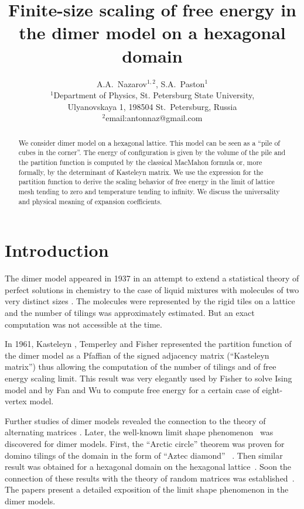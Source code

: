 \documentclass{article}
\begin{document}
\title{Finite-size scaling of free energy in the dimer model on a hexagonal domain}

\author{A.A.~Nazarov$^{1,2}$, S.A.~Paston$^{1}$\\
{\small
  $^{1}$Department of Physics, St. Petersburg State University,} \\
{\small  Ulyanovskaya 1, 198504 St.~Petersburg, Russia}\\
\small{$^{2}$email:antonnaz@gmail.com}
}
\date{}
\maketitle

\begin{abstract}
  We consider dimer model on a hexagonal lattice. This model can be seen as a ``pile of cubes in the
  corner''. The energy of configuration is given by the volume of the pile and the partition
  function is computed by the classical MacMahon formula or, more formally, by the determinant of
  Kasteleyn matrix. We use the expression for the partition function to derive the scaling behavior
  of free energy in the limit of lattice mesh tending to zero and temperature tending to infinity.
  We discuss the universality and physical meaning of expansion coefficients.
\end{abstract}


\section*{Introduction}
\label{sec:introduction}
The dimer model appeared in 1937 in an attempt to extend a statistical theory of perfect solutions
in chemistry to the case of liquid mixtures with molecules of two very distinct sizes
\cite{Fowler-1937}. The molecules were represented by the rigid tiles on a lattice and the number of
tilings was approximately estimated. But an exact computation was not accessible at the time.

In 1961, Kasteleyn \cite{P.W-1961}, Temperley and Fisher \cite{doi:10.1080/14786436108243366}
represented the partition function of the dimer model as a Pfaffian of the signed adjacency matrix
(``Kasteleyn matrix'') thus allowing the computation of the number of tilings and of free energy scaling limit.
This result was very elegantly used by Fisher to solve Ising model \cite{fisher1966dimer} and by Fan
and Wu \cite{Fan-1970} to compute free energy for a certain case of eight-vertex model.

Further studies of dimer models revealed the connection to the theory of alternating matrices
\cite{elkies1992alternating1,elkies1992alternating2}. Later, the well-known limit shape
phenomenon~\cite{vershik1977kerov} was discovered for dimer models. First, the ``Arctic circle''
theorem was proven for domino tilings of the domain in the form of ``Aztec diamond''
~\cite{1998math......1068J}. Then similar result was obtained for a hexagonal domain on the
hexagonal lattice~\cite{cohn1998shape}. Soon the connection of these results with the theory of
random matrices was established~\cite{johansson2002non}. The papers
\cite{kenyon2006dimers,kenyon2009lectures} present a detailed exposition of the limit shape
phenomenon in the dimer models.
\end{document}

